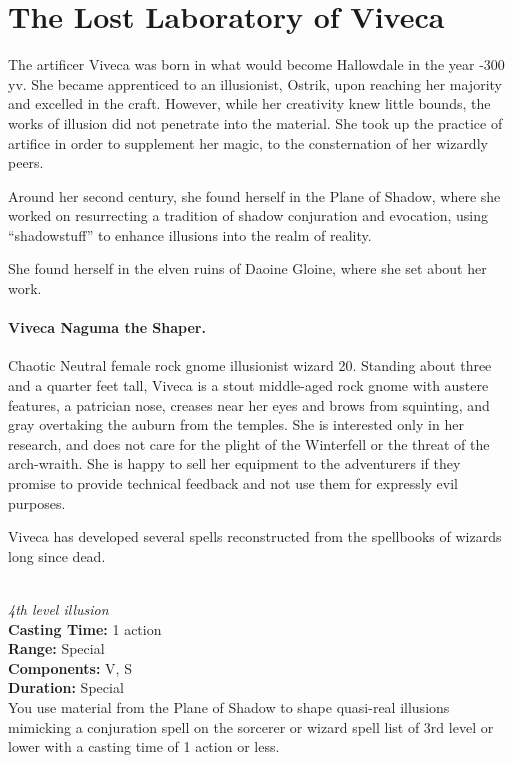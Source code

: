 \section{The Lost Laboratory of Viveca}

The artificer Viveca was born in what would become Hallowdale in the year
-300 yv. She became apprenticed to an illusionist, Ostrik, upon reaching her majority
and excelled in the craft. However, while her creativity knew little bounds, the
works of illusion did not penetrate into the material. She took up the practice
of artifice in order to supplement her magic, to the consternation of her wizardly
peers.

Around her second century, she found herself in the Plane of Shadow, where she
worked on resurrecting a tradition of shadow conjuration and evocation, using
``shadowstuff'' to enhance illusions into the realm of reality.

She found herself in the elven ruins of Daoine Gloine, where she set about her work.

\paragraph{Viveca Naguma the Shaper.}
Chaotic Neutral female rock gnome illusionist wizard 20.
Standing about three and a quarter feet tall, Viveca is a stout middle-aged rock
gnome with austere features, a patrician nose, creases near her eyes and brows from
squinting, and gray overtaking the auburn from the temples. She is interested only
in her research, and does not care for the plight of the Winterfell or the threat
of the arch-wraith. She is happy to sell her equipment to the adventurers if they
promise to provide technical feedback and not use them for expressly evil purposes.

Viveca has developed several spells reconstructed from the spellbooks of wizards
long since dead.

 \\
\textit{4th level illusion} \\
\textbf{Casting Time:} 1 action \\
\textbf{Range:} Special \\
\textbf{Components:} V, S \\
\textbf{Duration:} Special \\

You use material from the Plane of Shadow to shape quasi-real illusions mimicking
a conjuration spell on the sorcerer or wizard spell list of 3rd level or lower with
a casting time of 1 action or less.

